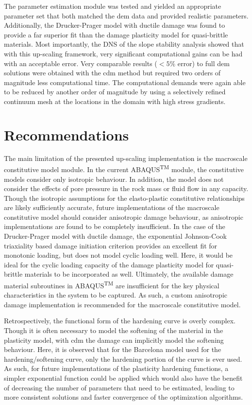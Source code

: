 The parameter estimation module was tested and yielded an appropriate parameter set that both matched the \acrshort{dem} data and provided realistic parameters. Additionally, the Drucker-Prager model with ductile damage was found to provide a far superior fit than the damage plasticity model for quasi-brittle materials. Most importantly, the DNS of the slope stability analysis showed that with this up-scaling framework, very significant computational gains can be had with an acceptable error. Very comparable results ($<5\%$ error) to full \acrshort{dem} solutions were obtained with the \acrshort{cdm} method but required two orders of magnitude less computational time. The computational demands were again able to be reduced by another order of magnitude by using a selectively refined continuum mesh at the locations in the domain with high stress gradients.

\section{Recommendations}

The main limitation of the presented up-scaling implementation is the macroscale constitutive model module. In the current ABAQUS\textsuperscript{TM} module, the constitutive models consider only isotropic behaviour. In addition, the model does not consider the effects of pore pressure in the rock mass or fluid flow in any capacity. Though the isotropic assumptions for the elasto-plastic constitutive relationships are likely sufficiently accurate, future implementations of the macroscale constitutive model should consider anisotropic damage behaviour, as anisotropic implementations are found to be completely insufficient. In the case of the Drucker-Prager model with ductile damage, the exponential Johnson-Cook triaxiality based damage initiation criterion provides an excellent fit for monotonic loading, but does not model cyclic loading well. Here, it would be ideal for the cyclic loading capacity of the damage plasticity model for quasi-brittle materials to be incorporated as well. Ultimately, the available damage material subroutines in ABAQUS\textsuperscript{TM} are insufficient for the key physical characteristics in the system to be captured. As such, a custom anisotropic damage implementation is recommended for the macroscale constitutive model.

Retrospectively, the functional form of the hardening curve is overly complex. Though it is often necessary to model the softening of the material in the plasticity model, with \acrshort{cdm} the damage can implicitly model the softening behaviour. Here, it is observed that for the Barcelona model used for the hardening/softening curve, only the hardening portion of the curve is ever used. As such, for future implementations of the plasticity hardening functions, a simpler exponential function could be applied which would also have the benefit of decreasing the number of parameters that need to be estimated, leading to more consistent solutions and faster convergence of the optimization algorithms. 


